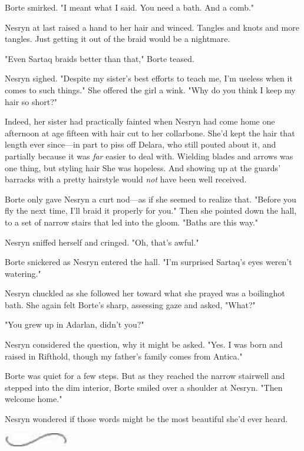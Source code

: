 Borte smirked.
"I meant what I said.
You need a bath.
And a comb."

Nesryn at last raised a hand to her hair and winced.
Tangles and knots and more tangles.
Just getting it out of the braid would be a nightmare.

"Even Sartaq braids better than that," Borte teased.

Nesryn sighed.
"Despite my sister's best efforts to teach me, I'm useless when it comes to such things."
She offered the girl a wink.
"Why do you think I keep my hair so short?"

Indeed, her sister had practically fainted when Nesryn had come home one afternoon at age fifteen with hair cut to her collarbone.
She'd kept the hair that length ever since---in part to piss off Delara, who still pouted about it, and partially because it was \emph{far} easier to deal with.
Wielding blades and arrows was one thing, but styling hair  She was hopeless.
And showing up at the guards' barracks with a pretty hairstyle would \emph{not} have been well received.

Borte only gave Nesryn a curt nod---as if she seemed to realize that.
"Before you fly the next time, I'll braid it properly for you."
Then she pointed down the hall, to a set of narrow stairs that led into the gloom.
"Baths are this way."

Nesryn sniffed herself and cringed.
"Oh, that's awful."

Borte snickered as Nesryn entered the hall.
"I'm surprised Sartaq's eyes weren't watering."

Nesryn chuckled as she followed her toward what she prayed was a boilinghot bath.
She again felt Borte's sharp, assessing gaze and asked, "What?"

"You grew up in Adarlan, didn't you?"

Nesryn considered the question, why it might be asked.
"Yes.
I was born and raised in Rifthold, though my father's family comes from Antica."

Borte was quiet for a few steps.
But as they reached the narrow stairwell and stepped into the dim interior, Borte smiled over a shoulder at Nesryn.
"Then welcome home."

Nesryn wondered if those words might be the most beautiful she'd ever heard.

\begin{center}
	\includegraphics[width=1.12in,height=0.24in]{images/seperator}
\end{center}

